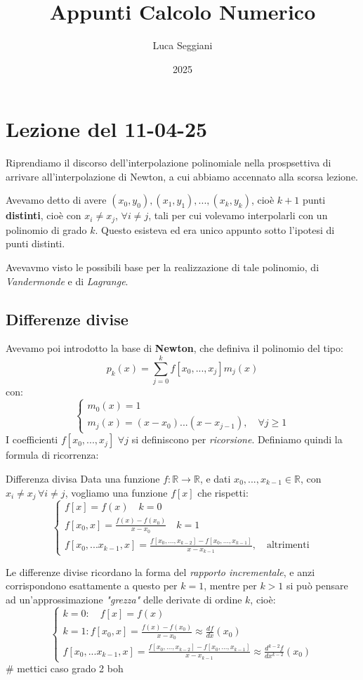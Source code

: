 \documentclass[a4paper,11pt]{article}
\title{Appunti Calcolo Numerico}
\author{Luca Seggiani}
\date{2025}
\begin{document}
\section{Lezione del 11-04-25}

\thispagestyle{empty}
\pagestyle{fancy}

Riprendiamo il discorso dell'interpolazione polinomiale nella prospsettiva di arrivare all'interpolazione di Newton, a cui abbiamo accennato alla scorsa lezione.

Avevamo detto di avere $(x_0, y_0), (x_1, y_1), ..., (x_k, y_k)$, cioè $k + 1$ punti \textbf{distinti}, cioè con $x_i \neq x_j$, $\forall i \neq j$, tali per cui volevamo interpolarli con un polinomio di grado $k$.
Questo esisteva ed era unico appunto sotto l'ipotesi di punti distinti.

Avevavmo visto le possibili base per la realizzazione di tale polinomio, di \textit{Vandermonde} e di \textit{Lagrange}.

\subsection{Differenze divise}
Avevamo poi introdotto la base di \textbf{Newton}, che definiva il polinomio del tipo:
$$
p_k (x) = \sum_{j = 0}^k f [ x_0, ..., x_j ] m_j(x)
$$
con:
\[
	\begin{cases}
		m_0(x) = 1 \\ 
		m_j(x) = (x - x_0) ... (x - x_{j - 1}), \quad \forall j \geq 1
	\end{cases}
\]
I coefficienti $f[x_0, ..., x_j]$ $\forall j$ si definiscono per \textit{ricorsione}.
Definiamo quindi la formula di ricorrenza:
\begin{definition}{Differenza divisa}
	Data una funzione $f: \mathbb{R} \rightarrow \mathbb{R}$, e dati $x_0, ..., x_{k - 1} \in \mathbb{R}$, con $x_i \neq x_j \, \forall i \neq j$, vogliamo una funzione $f[x]$ che rispetti:
	\[
		\begin{cases}
			f[x] = f(x) \quad k = 0 \\
			f[x_0, x] = \frac{f(x) - f(x_0)}{x - x_0} \quad k = 1 \\
			f[x_0, ... x_{k - 1}, x] = \frac{ f[x_0, ..., x_{k - 2}] - f[x_0, ..., x_{k - 1}] }{ x - x_{k - 1} }, \quad \text{altrimenti}
		\end{cases}
	\]
\end{definition}

Le differenze divise ricordano la forma del \textit{rapporto incrementale}, e anzi corrispondono esattamente a questo per $k = 1$, mentre per $k>1$ si può pensare ad un'approssimazione \textit{"grezza"} delle derivate di ordine $k$, cioè:
\[
	\begin{cases}
		k = 0 : \quad f[x] = f(x)  \\
		k = 1 : f[x_0, x] = \frac{f(x) - f(x_0)}{x - x_0} \approx \frac{df}{dx}(x_0) \\
		f[x_0, ... x_{k - 1}, x] = \frac{ f[x_0, ..., x_{k - 2}] - f[x_0, ..., x_{k - 1}] }{ x - x_{k - 1} } \approx \frac{d^{k-2}f}{dx^{k-2}}(x_0) 
	\end{cases}
\] # mettici caso grado 2 boh
\end{document}

